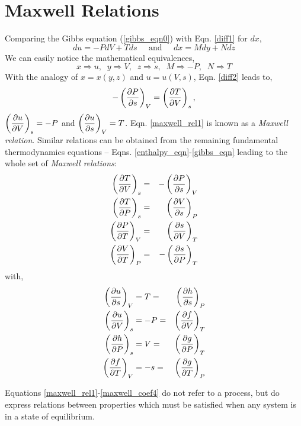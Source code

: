 \section{Maxwell Relations}

Comparing the Gibbs equation (\ref{gibbs_eqn0}) with Eqn. \ref{diff1} for $dx$,
\begin{displaymath}
du = -PdV +Tds \;\;\;\;\;\text{and}\;\;\;\;\; dx = Mdy + Ndz 
\end{displaymath}
We can easily notice the mathematical equivalences,
\begin{displaymath}
x\Longrightarrow u, \;\; y\Longrightarrow V, \;\; z\Longrightarrow s, \;\; M\Longrightarrow -P, \;\; N\Longrightarrow T
\end{displaymath}
\noindent
With the analogy of $x=x(y,z)$ and $u=u(V,s)$, Eqn. \ref{diff2} leads to,
\begin{equation}
-\left(\displaystyle\frac{\partial P}{\partial s}\right)_{V} = \left(\frac{\partial T}{\partial V}\right)_{s}, \label{maxwell_rel1} 
\end{equation}
\noindent
$\left(\displaystyle\frac{\partial u}{\partial V}\right)_{s} = -P$ and $\left(\displaystyle\frac{\partial u}{\partial s}\right)_{V}=T$.  Eqn. \ref{maxwell_rel1} is known as a {\it Maxwell relation}. Similar relations can be obtained from the remaining fundamental thermodynamics equations -- Eqns. \ref{enthalpy_eqn}-\ref{gibbs_eqn} leading to the whole set of {\it Maxwell relations}:
\begin{eqnarray}
%
 \left(\frac{\partial T}{\partial V}\right)_{s} &=& -\left(\frc{\partial P}{\partial s}\right)_{V} \nonumber \\
%
 \left(\frc{\partial T}{\partial P}\right)_{s} &=& \left(\frac{\partial V}{\partial s}\right)_{P} \label{maxwell_rel2} \\
%
 \left(\frc{\partial P}{\partial T}\right)_{V} &=& \left(\frac{\partial s}{\partial V}\right)_{T} \label{maxwell_rel3} \\
%
  \left(\frac{\partial V}{\partial T}\right)_{P} &=& -\left(\frc{\partial s}{\partial P}\right)_{T} \label{maxwell_rel4} 
\end{eqnarray}
\noindent
with,
\begin{eqnarray}
%
\left(\frc{\partial u}{\partial s}\right)_{V} & =  T  = & \left(\frc{\partial h}{\partial s}\right)_{P} \label{maxwell_coef1} \\
%
\left(\frc{\partial u}{\partial V}\right)_{s} & = - P = & \left(\frc{\partial f}{\partial V}\right)_{T} \label{maxwell_coef2} \\
%
\left(\frc{\partial h}{\partial P}\right)_{s} & =  V =  & \left(\frc{\partial g}{\partial P}\right)_{T} \label{maxwell_coef3} \\
%
\left(\frc{\partial f}{\partial T}\right)_{V} & =  -s  = & \left(\frc{\partial g}{\partial T}\right)_{P} \label{maxwell_coef4}
%
\end{eqnarray}

Equations \ref{maxwell_rel1}-\ref{maxwell_coef4} do not refer to a process, but do express relations between properties which must be satisfied when any system is in a state of equilibrium.



